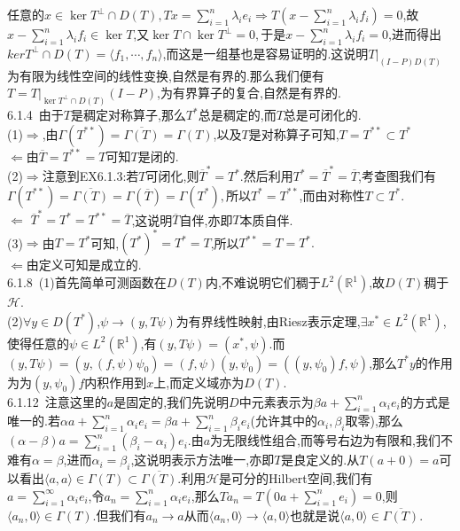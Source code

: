 \documentclass[b5paper]{ctexart}
\begin{document}
任意的$x\in\ker T^{\perp}\cap D(T),Tx=\sum\limits_{i=1}^n\lambda_ie_i\Rightarrow T(x-\sum\limits_{i=1}^n\lambda_if_i)=0$,故$x-\sum\limits_{i=1}^n\lambda_if_i\in\ker T$,又$\ker T\cap \ker T^{\perp}=0,$于是$x-\sum\limits_{i=1}^n\lambda_if_i=0$,进而得出$ker T^{\perp}\cap D(T)=\langle f_1,\cdots,f_n\rangle$,而这是一组基也是容易证明的.这说明$T|_{(I-P)D(T)}$为有限为线性空间的线性变换,自然是有界的.那么我们便有$T=T|_{\ker T^{\perp}\cap D(T)}(I-P)$,为有界算子的复合,自然是有界的.\\
6.1.4~由于$T$是稠定对称算子,那么$T^*$总是稠定的,而$T$总是可闭化的.\\
(1)$\Rightarrow$,由$\varGamma(T^{**})=\overline{\varGamma(T)}=\varGamma(T)$,以及$T$是对称算子可知,$T=T^{**} \subset T^*$\\
$\Leftarrow$由$\overline{T}=T^{**}=T$可知$T$是闭的.\\
(2)$\Rightarrow$注意到EX6.1.3:若$T$可闭化,则$\overline{T}^*=T^*$.然后利用$T^*=\overline{T}^*=\overline{T}$,考查图我们有$\varGamma(T^{**})=\overline{\varGamma(T)}=\varGamma(\overline{T})=\varGamma(T^*),$所以$T^*=T^{**}$,而由对称性$T\subset T^*$.\\
$\Leftarrow$
$\overline{T}^*=T^*=T^{**}=\overline{T}$,这说明$\overline{T}$自伴,亦即$T$本质自伴.\\
(3)$\Rightarrow$由$T=T^*$可知,$(T^*)^*=T^*=T$,所以$T^{**}=T=T^*.$\\
$\Leftarrow$由定义可知是成立的.\\
6.1.8~(1)首先简单可测函数在$D(T)$内,不难说明它们稠于$L^2(\mathbb{R}^1)$,故$D(T)$稠于$\mathscr{H}$.\\
(2)$\forall y\in D(T^*)$,$\psi\to (y,T\psi)$为有界线性映射,由Riesz表示定理,$\exists x^*\in L^2(\mathbb{R}^1)$,使得任意的$\psi\in L^2(\mathbb{R}^1)$,有$(y,T\psi)=(x^*,\psi)$.而$(y,T\psi)=(y,(f,\psi)\psi_0)=(f,\psi)(y,\psi_0)=((y,\psi_0)f,\psi)$,那么$T^*y$的作用为为$(y,\psi_0)f$内积作用到$x$上,而定义域亦为$D(T)$.\\
6.1.12~注意这里的$a$是固定的,我们先说明$D$中元素表示为$\beta a+\sum\limits_{i=1}^n\alpha_ie_i$的方式是唯一的.若$\alpha a+\sum\limits_{i=1}^n\alpha_ie_i=\beta a+\sum \limits_{i=1}^n\beta_ie_i$(允许其中的$\alpha_i,\beta_i$取零),那么$(\alpha-\beta)a=\sum\limits_{i=1}^n(\beta_i-\alpha_i)e_i$.由$a$为无限线性组合,而等号右边为有限和,我们不难有$\alpha=\beta$,进而$\alpha_i=\beta_i$,这说明表示方法唯一,亦即$T$是良定义的.从$T(a+0)=a$可以看出$\langle a,a\rangle\in \varGamma(T)\subset\overline{\varGamma(T)}$.利用$\mathscr{H}$是可分的Hilbert空间,我们有$a=\sum\limits_{i=1}^{\infty}\alpha_ie_i$,令$a_n=\sum\limits_{i=1}^{n}\alpha_ie_i$,那么$Ta_n=T(0a+\sum\limits_{i=1}^ne_i)=0$,则$\langle a_n,0\rangle\in \varGamma(T)$.但我们有$a_n\to a$从而$\langle a_n,0\rangle\to \langle a,0\rangle$也就是说$\langle a,0\rangle\in \overline{\varGamma(T)}$.\\
\end{document}
